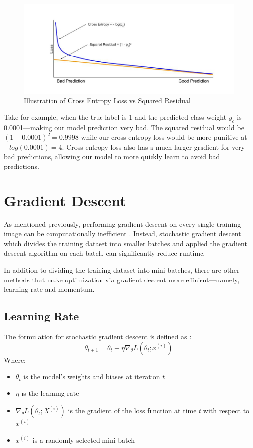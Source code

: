 \documentclass [MAS] {uclathes}
\begin{document}
\begin{figure}[H]
    \centering
    \includegraphics[width=1\linewidth]{figures/CE vs Square Residual.jpg}
    \caption{Illustration of Cross Entropy Loss vs Squared Residual \cite{cross_entropy_lecture}}
\end{figure}

Take for example, when the true label is 1 and the predicted class weight \(y_{c}\) is 0.0001---making our model 
prediction very bad. The squared residual would be \((1-0.0001)^{2} = 0.9998\) while our cross entropy loss would be 
more punitive at \(-log(0.0001) = 4\). Cross entropy loss also has a much larger gradient for very bad predictions, 
allowing our model to more quickly learn to avoid bad predictions.

\section{Gradient Descent}
As mentioned previously, performing gradient descent on every single training image can be computationally inefficient \cite{gradient_desc}. 
Instead, stochastic gradient descent which divides the training dataset into smaller batches and applied the gradient 
descent algorithm on each batch, can significantly reduce runtime. 

In addition to dividing the training dataset into mini-batches, there are other methods that make optimization via 
gradient descent more efficient---namely, learning rate and momentum.

\subsection{Learning Rate}
The formulation for stochastic gradient descent is defined as \cite{deeplearningbook}:
\[\theta_{t+1} = \theta_{t} - \eta\nabla_{\theta}L(\theta_{t};x^{(i)})\]
Where:
\begin{itemize}
    \item \(\theta_{t}\) is the model's weights and biases at iteration \(t\)
    \item \(\eta\) is the learning rate
    \item \(\nabla_{\theta}L(\theta_{t};X^{(i)})\) is the gradient of the loss function at time \(t\) with respect to 
    \(x^{(i)}\)
    \item \(x^{(i)}\) is a randomly selected mini-batch
\end{itemize}
\end{document}
